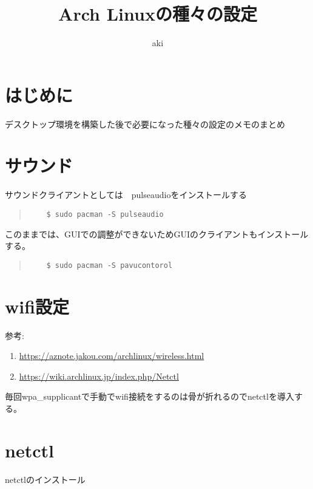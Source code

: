 \documentclass[dvipdfmx]{jsarticle}
\begin{document}
\title{Arch Linuxの種々の設定}
\author{aki}
\maketitle

\section{はじめに}

デスクトップ環境を構築した後で必要になった種々の設定のメモのまとめ

\section{サウンド}

サウンドクライアントとしては　pulseaudioをインストールする

\begin{quote}
    \begin{verbatim}
	$ sudo pacman -S pulseaudio
    \end{verbatim}
\end{quote}


このままでは、GUIでの調整ができないためGUIのクライアントもインストールする。

\begin{quote}
    \begin{verbatim}
	$ sudo pacman -S pavucontorol
    \end{verbatim}
\end{quote}

\section{wifi設定}

参考: 
\begin{enumerate}
    \item  \url{https://aznote.jakou.com/archlinux/wireless.html}
    \item  \url{https://wiki.archlinux.jp/index.php/Netctl}
\end{enumerate}

      

毎回wpa\_supplicantで手動でwifi接続をするのは骨が折れるのでnetctlを導入する。

\section{netctl} 

netctlのインストール
  
\end{document}
